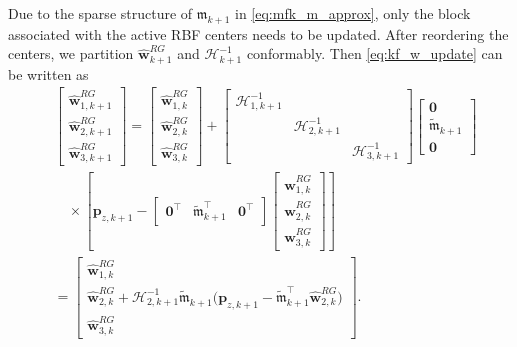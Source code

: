 \documentclass[journal,twoside,web]{ieeecolor}
\begin{document}
Due to the sparse structure of $\mathfrak{m}_{k+1}$ in \eqref{eq:mfk_m_approx}, only the block associated with the active RBF centers needs to be updated. After reordering the centers, we partition $\hat{\mathbf{w}}_{k+1}^{RG}$ and $\mathcal{H}_{k+1}^{-1}$ conformably. Then \eqref{eq:kf_w_update} can be written as
\begin{align}
    &\begin{bmatrix}
        \hat{\mathbf{w}}_{1,k+1}^{RG}\\
        \hat{\mathbf{w}}_{2,k+1}^{RG}\\
        \hat{\mathbf{w}}_{3,k+1}^{RG}
    \end{bmatrix}
    =
    \begin{bmatrix}
        \hat{\mathbf{w}}_{1,k}^{RG}\\
        \hat{\mathbf{w}}_{2,k}^{RG}\\
        \hat{\mathbf{w}}_{3,k}^{RG}
    \end{bmatrix}
    +
    \begin{bmatrix}
        \bm{\mathcal{H}}_{1,k+1}^{-1} & & \\
        & \bm{\mathcal{H}}_{2,k+1}^{-1} & \\
        & & \bm{\mathcal{H}}_{3,k+1}^{-1}
    \end{bmatrix}
    \begin{bmatrix}
        \mathbf{0}\\
        \tilde{\mathfrak{m}}_{k+1}\\
        \mathbf{0}
    \end{bmatrix}\nonumber\\
    &\quad\times
    \left[
    \mathbf{p}_{z,k+1}
    -
    \begin{bmatrix}
        \mathbf{0}^\top & \tilde{\mathfrak{m}}_{k+1}^\top & \mathbf{0}^\top
    \end{bmatrix}
    \begin{bmatrix}
        \hat{\mathbf{w}}_{1,k}^{RG}\\
        \hat{\mathbf{w}}_{2,k}^{RG}\\
        \hat{\mathbf{w}}_{3,k}^{RG}
    \end{bmatrix}
    \right]\nonumber\\
    &=
    \begin{bmatrix}
        \hat{\mathbf{w}}_{1,k}^{RG}\\
        \hat{\mathbf{w}}_{2,k}^{RG}
        +\bm{\mathcal{H}}_{2,k+1}^{-1}\tilde{\mathfrak{m}}_{k+1}
        \bigl(\mathbf{p}_{z,k+1}-\tilde{\mathfrak{m}}_{k+1}^\top\hat{\mathbf{w}}_{2,k}^{RG}\bigr)\\
        \hat{\mathbf{w}}_{3,k}^{RG}
    \end{bmatrix}.
    \label{eq:active_rows_weights_update}
\end{align}
\end{document}
